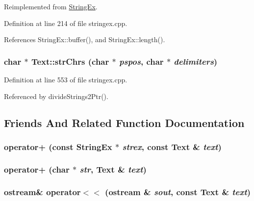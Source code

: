 Reimplemented from \hyperlink{classStringEx_bb126ddaf548a3432f55c2dada139f64}{StringEx}.

Definition at line 214 of file stringex.cpp.

References StringEx::buffer(), and StringEx::length().\hypertarget{classText_e14ba07e81e2f56fd571e5743fb5c926}{
\subsubsection[{strChrs}]{\setlength{\rightskip}{0pt plus 5cm}char $\ast$ Text::strChrs (char $\ast$ {\em pspos}, \/  char $\ast$ {\em delimiters})}}
\label{classText_e14ba07e81e2f56fd571e5743fb5c926}




Definition at line 553 of file stringex.cpp.

Referenced by divideStrings2Ptr().

\subsection{Friends And Related Function Documentation}
\hypertarget{classText_feaf47fd3ca2d35a8c585cfc501f3232}{
\subsubsection[{operator+}]{ operator+ (const {\bf StringEx} $\ast$ {\em strex}, \/  const {\bf Text} \& {\em text})}}
\label{classText_feaf47fd3ca2d35a8c585cfc501f3232}


\hypertarget{classText_2d8fa31b7e559f47220611a94b95621f}{
\subsubsection[{operator+}]{ operator+ (char $\ast$ {\em str}, \/  {\bf Text} \& {\em text})}}
\label{classText_2d8fa31b7e559f47220611a94b95621f}


\hypertarget{classText_9ed04896cb06ca94784a8bfc70017d5f}{
\subsubsection[{operator$<$$<$}]{\setlength{\rightskip}{0pt plus 5cm}ostream\& operator$<$$<$ (ostream \& {\em sout}, \/  const {\bf Text} \& {\em text})}}
\label{classText_9ed04896cb06ca94784a8bfc70017d5f}




